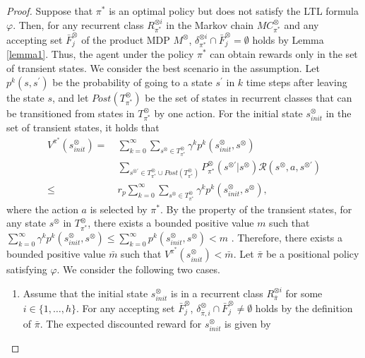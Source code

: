 \documentclass[letterpaper, 10 pt, conference]{ieeeconf}  %
\begin{document}
\begin{proof}
  Suppose that $\pi^{\ast}$ is an optimal policy but does not satisfy the LTL formula $\varphi$. Then, for any recurrent class $R^{\otimes i}_{{\pi}^{\ast}}$ in the Markov chain $MC^{\otimes}_{{\pi}^{\ast}}$ and any accepting set $\bar{F}^{\otimes}_j$ of the product MDP $M^{\otimes}$,  $\delta^{\otimes i}_{\pi^{\ast}} \cap \bar{F}^{\otimes}_j = \emptyset$
  holds by Lemma \ref{lemma1}. Thus, the agent under the policy $\pi^{\ast}$ can obtain rewards only in the set of transient states. We consider the best scenario in the assumption. Let $p^k(s,s^{\prime})$ be the probability of going to a state $s^{\prime}$ in $k$ time steps after leaving the state $s$, and let $Post(T^{\otimes}_{\pi^{\ast}})$ be the set of states in recurrent classes that can be transitioned from states in $T^{\otimes}_{\pi^{\ast}}$ by one action. For the initial state $s^{\otimes}_{init}$ in the set of transient states, it holds that
  \begin{align}
    V^{\pi^{\ast}}\!(s^{\otimes}_{init})
     =\ & \sum_{k=0}^{\infty} \sum_{s^{\otimes} \in T^{\otimes}_{\pi^{\ast}}} \gamma^k p^k(s^{\otimes}_{init}, s^{\otimes}) \nonumber \\
      & \sum_{s^{\otimes \prime} \in T^{\otimes}_{\pi^{\ast}} \cup Post(T^{\otimes}_{\pi^{\ast}})} \!\!\!\!P^{\otimes}_{\pi^{\ast}}(s^{\otimes \prime}| s^{\otimes}) \mathcal{R}(s^{\otimes}, a, s^{\otimes \prime})\nonumber \\
     \leq\ & r_p \sum_{k=0}^{\infty} \sum_{s^{\otimes} \in T^{\otimes}_{\pi^{\ast}}} \gamma^k p^k(s^{\otimes}_{init}, s^{\otimes}), \nonumber
  \label{eqth11}
  \end{align}
  where the action $a$ is selected by $\pi^{\ast}$. By the property of the transient states, for any state $s^{\otimes}$ in $T^{\otimes}_{\pi^{\ast}}$, there exists a bounded positive value $m$ such that $ \sum_{k=0}^{\infty} \gamma^k p^k(s^{\otimes}_{init}, s^{\otimes}) \leq \sum_{k=0}^{\infty} p^k(s^{\otimes}_{init}, s^{\otimes}) < m$ \cite{ESS}. Therefore, there exists a bounded positive value $\bar{m}$ such that $V^{\pi^{\ast}}(s^{\otimes}_{init}) < \bar{m}$.
  Let $\bar{\pi}$ be a positional policy satisfying $\varphi$. We consider the following two cases.
  \begin{enumerate}
    \vspace{2mm}
    \item Assume that the initial state $s^{\otimes}_{init}$ is in a recurrent class $R^{\otimes i}_{\bar{\pi}}$ for some $ i \in \{1,\ldots,h\} $.
    For any accepting set $\bar{F}^{\otimes}_j$, $\delta^{\otimes}_{\bar{\pi},i} \cap \bar{F}^{\otimes}_j \neq \emptyset$ holds by the definition of $\bar{\pi}$. The expected discounted reward for $s^{\otimes}_{init}$ is given by

\end{enumerate}
\end{proof}
\end{document}
